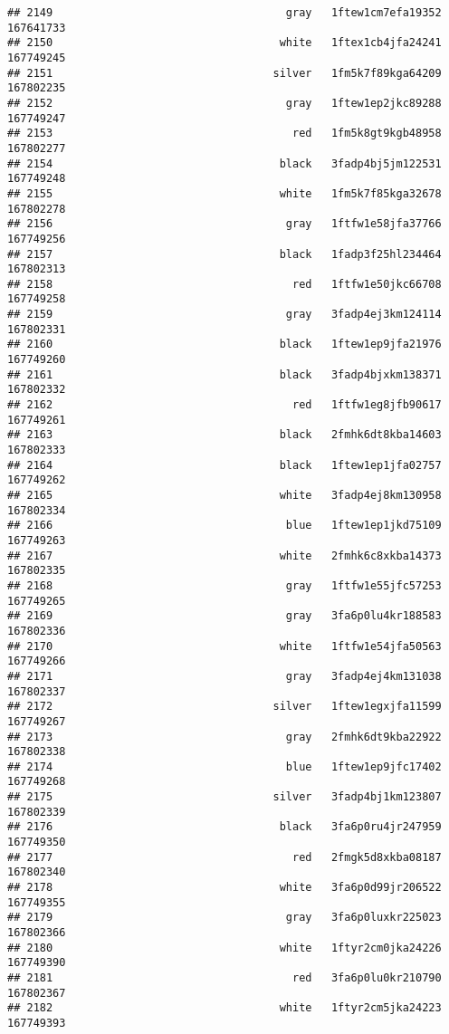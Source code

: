 \documentclass[
]{article}
\begin{document}
\begin{verbatim}
## 2149                                    gray   1ftew1cm7efa19352 167641733
## 2150                                   white   1ftex1cb4jfa24241 167749245
## 2151                                  silver   1fm5k7f89kga64209 167802235
## 2152                                    gray   1ftew1ep2jkc89288 167749247
## 2153                                     red   1fm5k8gt9kgb48958 167802277
## 2154                                   black   3fadp4bj5jm122531 167749248
## 2155                                   white   1fm5k7f85kga32678 167802278
## 2156                                    gray   1ftfw1e58jfa37766 167749256
## 2157                                   black   1fadp3f25hl234464 167802313
## 2158                                     red   1ftfw1e50jkc66708 167749258
## 2159                                    gray   3fadp4ej3km124114 167802331
## 2160                                   black   1ftew1ep9jfa21976 167749260
## 2161                                   black   3fadp4bjxkm138371 167802332
## 2162                                     red   1ftfw1eg8jfb90617 167749261
## 2163                                   black   2fmhk6dt8kba14603 167802333
## 2164                                   black   1ftew1ep1jfa02757 167749262
## 2165                                   white   3fadp4ej8km130958 167802334
## 2166                                    blue   1ftew1ep1jkd75109 167749263
## 2167                                   white   2fmhk6c8xkba14373 167802335
## 2168                                    gray   1ftfw1e55jfc57253 167749265
## 2169                                    gray   3fa6p0lu4kr188583 167802336
## 2170                                   white   1ftfw1e54jfa50563 167749266
## 2171                                    gray   3fadp4ej4km131038 167802337
## 2172                                  silver   1ftew1egxjfa11599 167749267
## 2173                                    gray   2fmhk6dt9kba22922 167802338
## 2174                                    blue   1ftew1ep9jfc17402 167749268
## 2175                                  silver   3fadp4bj1km123807 167802339
## 2176                                   black   3fa6p0ru4jr247959 167749350
## 2177                                     red   2fmgk5d8xkba08187 167802340
## 2178                                   white   3fa6p0d99jr206522 167749355
## 2179                                    gray   3fa6p0luxkr225023 167802366
## 2180                                   white   1ftyr2cm0jka24226 167749390
## 2181                                     red   3fa6p0lu0kr210790 167802367
## 2182                                   white   1ftyr2cm5jka24223 167749393

\end{verbatim}
\end{document}
